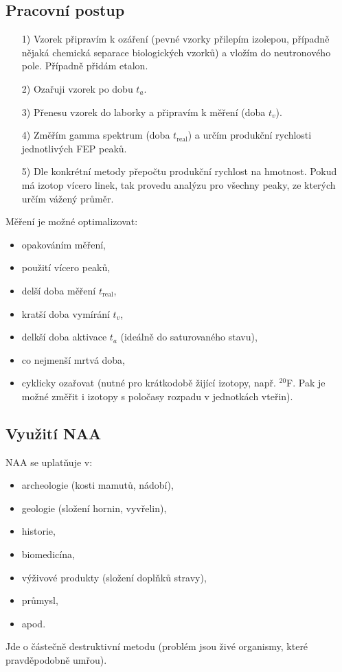 \subsection{Pracovní postup}

\begin{itemize}
    \item[1)] Vzorek připravím k ozáření (pevné vzorky přilepím izolepou, případně nějaká chemická separace biologických vzorků) a vložím do neutronového pole. Případně přidám etalon.
    \item[2)] Ozařuji vzorek po dobu $t_a$.
    \item[3)] Přenesu vzorek do laborky a připravím k měření (doba $t_v$).
    \item[4)] Změřím gamma spektrum (doba $t_\text{real}$) a určím produkční rychlosti jednotlivých FEP peaků.
    \item[5)] Dle konkrétní metody přepočtu produkční rychlost na hmotnost. Pokud má izotop vícero linek, tak provedu analýzu pro všechny peaky, ze kterých určím vážený průměr.
\end{itemize}

Měření je možné optimalizovat:

\begin{itemize}
    \item opakováním měření, 
    \item použití vícero peaků,
    \item delší doba měření $t_\text{real}$,
    \item kratší doba vymírání $t_v$,
    \item delkší doba aktivace $t_a$ (ideálně do saturovaného stavu),
    \item co nejmenší mrtvá doba,
    \item cyklicky ozařovat (nutné pro krátkodobě žijící izotopy, např. $^{20}$F. Pak je možné změřit i izotopy s poločasy rozpadu v jednotkách vteřin).
\end{itemize}


\subsection{Využití NAA}

NAA se uplatňuje v:

\begin{itemize}
    \item archeologie (kosti mamutů, nádobí),
    \item geologie (složení hornin, vyvřelin),
    \item historie,
    \item biomedicína,
    \item výživové produkty (složení doplňků stravy),
    \item průmysl,
    \item apod.
\end{itemize}

Jde o částečně destruktivní metodu (problém jsou živé organismy, které pravděpodobně umřou).